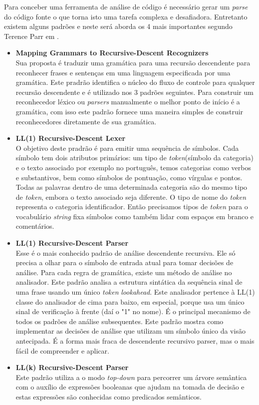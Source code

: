 Para conceber uma ferramenta de análise de código é necessário gerar um \textit{parse} do código fonte o que torna isto uma tarefa complexa e desafiadora. Entretanto existem alguns padrões e neste será aborda os 4 mais importantes segundo Terence Parr em \cite{Parr:2009:LIP:1823613}.
\begin{itemize}
	\item \textbf{Mapping Grammars to Recursive-Descent Recognizers}\\
	Sua proposta é traduzir uma gramática para uma recursão descendente para reconhecer frases e sentenças em uma linguagem especificada por uma gramática. Este pradrão identifica o núcleo do fluxo de controle para qualquer recursão descendente e é utilizado nos 3 padrões seguintes. 
	Para construir um reconhecedor léxico ou \textit{parsers} manualmente o melhor ponto de início é a gramática, com isso este padrão fornece uma maneira simples de construir reconhecedores diretamente de sua gramática.
	
	\item \textbf{LL(1) Recursive-Descent Lexer}\\
	O objetivo deste pradrão é para emitir uma sequência de símbolos. Cada símbolo tem dois atributos primários: um tipo de \textit{token}(símbolo da categoria) e o texto associado por exemplo 
	no português, temos categorias como verbos e substantivos, bem como símbolos de pontuação, como vírgulas e pontos. Todas as palavras dentro de uma determinada categoria são do mesmo tipo de \textit{token}, embora o texto associado seja diferente. O tipo de nome do \textit{token} representa o categoria identificador. Então precisamos tipos de \textit{token} para o vocabulário \textit{string} fixa símbolos como também lidar com espaços em branco e comentários.
	\item \textbf{LL(1) Recursive-Descent Parser}\\
	Esse é o mais conhecido padrão de análise descendente recursiva. Ele só precisa	a olhar para o símbolo de entrada atual para tomar decisões de análise. Para cada regra de gramática, existe um método de análise no analisador. Este padrão analisa a estrutura sintática da sequência sinal de uma frase usando um único \textit{token} \textit{lookahead}. Este analisador pertence à LL(1) classe do analisador de cima para baixo, em especial, porque usa um único sinal de verificação à frente (daí o "1" no nome). É o principal mecanismo de todos os padrões de análise subsequentes. Este padrão mostra como implementar as decisões de análise que utilizam um símbolo único da visão antecipada. É a forma mais fraca de descendente recursivo parser, mas o mais fácil de compreender e aplicar.
	\item \textbf{LL(k) Recursive-Descent Parser}\\
	Este padrão utiliza a o modo \textit{top-down} para percorrer um árvore semântica com o auxílio de expressões booleanas que ajudam na tomada de decisão e estas expressões são conhecidas como predicados semânticos.
	
\end{itemize}


